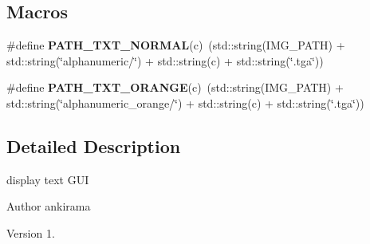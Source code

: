 \subsection*{Macros}
\begin{DoxyCompactItemize}
\item 
\hypertarget{_generate_text_8hh_a4a00225efd6ab9ce1673e6751c3acdbe}{}\#define {\bfseries P\+A\+T\+H\+\_\+\+T\+X\+T\+\_\+\+N\+O\+R\+M\+A\+L}(c)~(std\+::string(I\+M\+G\+\_\+\+P\+A\+T\+H) + std\+::string(\char`\"{}alphanumeric/\char`\"{}) + std\+::string(c) + std\+::string(\char`\"{}.tga\char`\"{}))\label{_generate_text_8hh_a4a00225efd6ab9ce1673e6751c3acdbe}

\item 
\hypertarget{_generate_text_8hh_aa4ff1239492b800dacc61260a614ef57}{}\#define {\bfseries P\+A\+T\+H\+\_\+\+T\+X\+T\+\_\+\+O\+R\+A\+N\+G\+E}(c)~(std\+::string(I\+M\+G\+\_\+\+P\+A\+T\+H) + std\+::string(\char`\"{}alphanumeric\+\_\+orange/\char`\"{}) + std\+::string(c) + std\+::string(\char`\"{}.tga\char`\"{}))\label{_generate_text_8hh_aa4ff1239492b800dacc61260a614ef57}

\end{DoxyCompactItemize}


\subsection{Detailed Description}
display text G\+U\+I 

\begin{DoxyAuthor}{Author}
ankirama 
\end{DoxyAuthor}
\begin{DoxyVersion}{Version}
1. 
\end{DoxyVersion}
